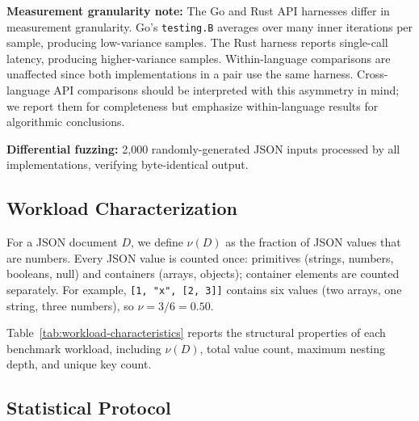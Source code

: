 \textbf{Measurement granularity note:} The Go and Rust API harnesses
differ in measurement granularity.  Go's \texttt{testing.B} averages
over many inner iterations per sample, producing low-variance samples.
The Rust harness reports single-call latency, producing higher-variance
samples.  Within-language comparisons are unaffected since both
implementations in a pair use the same harness.  Cross-language API
comparisons should be interpreted with this asymmetry in mind; we report
them for completeness but emphasize within-language results for
algorithmic conclusions.

\textbf{Differential fuzzing:} 2{,}000 randomly-generated JSON inputs
processed by all implementations, verifying byte-identical output.

\subsection{Workload Characterization}

For a JSON document $D$, we define $\nu(D)$ as the fraction of JSON
values that are numbers.  Every JSON value is counted once: primitives
(strings, numbers, booleans, null) and containers (arrays, objects);
container elements are counted separately.  For example,
\texttt{[1, "x", [2, 3]]} contains six values (two arrays, one string,
three numbers), so $\nu = 3/6 = 0.50$.

Table~\ref{tab:workload-characteristics} reports the structural
properties of each benchmark workload, including $\nu(D)$, total value
count, maximum nesting depth, and unique key count.



\subsection{Statistical Protocol}

